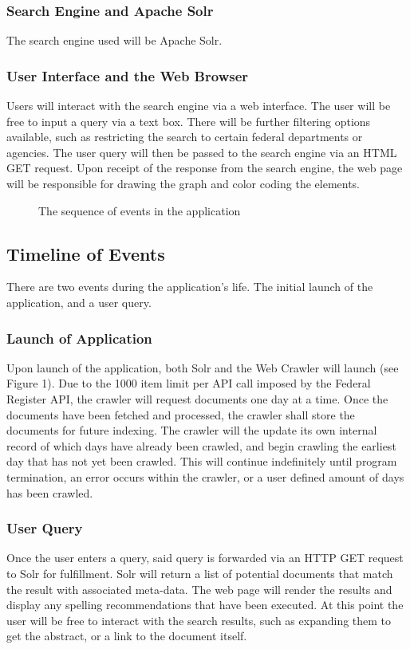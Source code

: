\documentclass{sig-alternate-05-2015}
\begin{document}
\subsubsection{Search Engine and Apache Solr}
The search engine used will be Apache Solr. 

\subsubsection{User Interface and the Web Browser}
Users will interact with the search engine via a web interface. The user will be free to input a query via a text box. There will be further filtering options available, such as restricting the search to certain federal departments or agencies. The user query will then be passed to the search engine via an HTML GET request. Upon receipt of the response from the search engine, the web page will be responsible for drawing the graph and color coding the elements. 

\begin{figure}
\centering
{}
\caption{The sequence of events in the application}
\end{figure}

\subsection{Timeline of Events}
There are two events during the application's life. The initial launch of the application, and a user query.

\subsubsection{Launch of Application}
Upon launch of the application, both Solr and the Web Crawler will launch (see Figure 1). Due to the 1000 item limit per API call imposed by the Federal Register API, the crawler will request documents one day at a time. Once the documents have been fetched and processed, the crawler shall store the documents for future indexing. The crawler will the update its own internal record of which days have already been crawled, and begin crawling the earliest day that has not yet been crawled. This will continue indefinitely until program termination, an error occurs within the crawler, or a user defined amount of days has been crawled.

\subsubsection{User Query}
Once the user enters a query, said query is forwarded via an HTTP GET request to Solr for fulfillment. Solr will return a list of potential documents that match the result with associated meta-data. The web page will render the results and display any spelling recommendations that have been executed. At this point the user will be free to interact with the search results, such as expanding them to get the abstract, or a link to the document itself.
\end{document}
